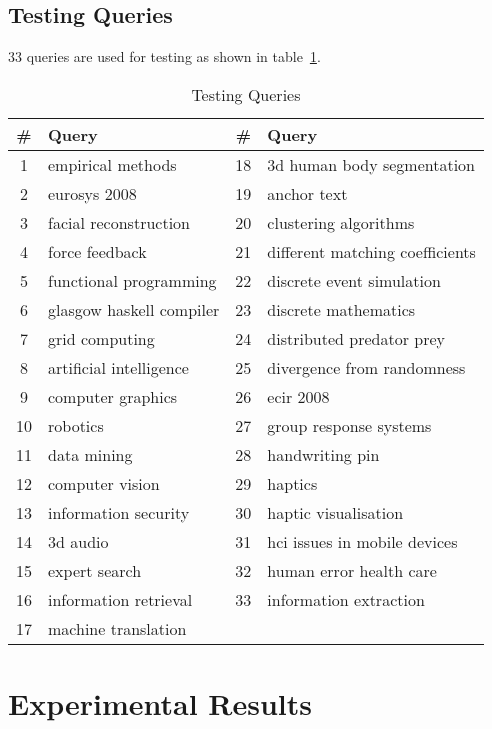 \subsection{Testing Queries}
33 queries are used for testing as shown in table~\ref{table:testingqueries}.
\begin{table}
\centering
\begin{tabular}{|c|l|c|l|}
\hline \textbf{\#} & \textbf{Query} & \textbf{\#} & \textbf{Query} \\
\hline 1 & empirical methods & 18 & 3d human body segmentation\\
\hline 2 & eurosys 2008 & 19 & anchor text \\
\hline 3  & facial reconstruction & 20 & clustering algorithms\\ 
\hline 4  & force feedback & 21 & different matching coefficients\\ 
\hline 5  & functional programming & 22 & discrete event simulation\\ 
\hline 6  & glasgow haskell compiler & 23 & discrete mathematics\\ 
\hline 7  & grid computing & 24 & distributed predator prey\\ 
\hline 8  & artificial intelligence & 25 & divergence from randomness\\ 
\hline 9  & computer graphics & 26 & ecir 2008 \\
\hline 10  & robotics & 27 & group response systems\\ 
\hline 11  & data mining & 28 & handwriting pin\\ 
\hline 12  & computer vision & 29 & haptics\\ 
\hline 13  & information security & 30 & haptic visualisation\\ 
\hline 14  & 3d audio & 31 & hci issues in mobile devices\\ 
\hline 15  & expert search & 32 & human error health care \\ 
\hline 16  & information retrieval & 33 & information extraction\\ 
\hline 17  & machine translation &  & \\ 
\hline
\end{tabular}
\caption{Testing Queries} \label{table:testingqueries}
\end{table}

\section{Experimental Results}


